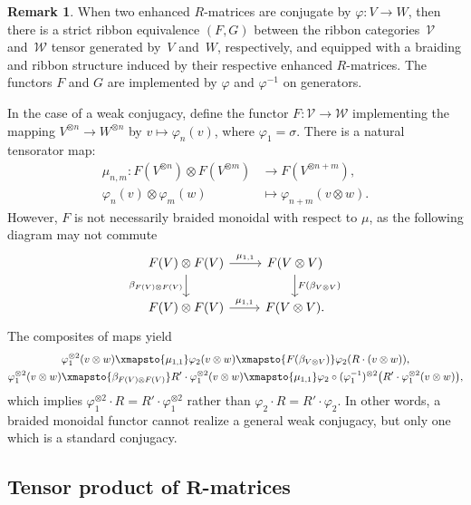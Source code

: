 \documentclass[10pt,a4paper]{amsart}
\numberwithin{equation}{section}
\theoremstyle{definition}
\newtheorem{Remark}[Theorem]{Remark}
\begin{document}
\begin{Remark}
 When two enhanced $R$-matrices are conjugate by $\varphi\colon V\to W$, then there is a strict ribbon equivalence $(F,G)$ between the ribbon categories~$\mathcal{V}$ and~$\mathcal{W}$ tensor generated by~$V$ and~$W$, respectively, and equipped with a braiding and ribbon structure induced by their respective enhanced $R$-matrices. The functors $F$ and $G$ are implemented by $\varphi$ and $\varphi^{-1}$ on generators.

In the case of a weak conjugacy, define the functor $F:\mathcal{V}\to\mathcal{W}$ implementing the mapping $V^{\otimes n} \to W^{\otimes n}$ by $v\mapsto \varphi_n(v)$, where $\varphi_1=\sigma$. There is a natural tensorator map:
\begin{align*} \mu_{n,m}\colon F(V^{\otimes n})\otimes F(V^{\otimes m})&\to F(V^{\otimes n+m}),
 \\
 \varphi_n(v)\otimes \varphi_m(w)&\mapsto\varphi_{n+m}(v\otimes w) .
 \end{align*}
However, $F$ is not necessarily braided monoidal with respect to $\mu$, as the following diagram may not commute
\begin{equation*}
\begin{tikzcd}
 F(V)\otimes F(V) \ar[r,"\mu_{1,1}"] \ar[d,swap,"\beta_{F(V)\otimes F(V)}"] & F(V\otimes V)
 \ar[d,"F(\beta_{V\otimes V})"]
 \\
 F(V)\otimes F(V)\ar[r,"\mu_{1,1}"]& F(V\otimes V).
 \end{tikzcd}
\end{equation*}
The composites of maps yield
\begin{gather*}
\varphi_1^{\otimes 2}(v\otimes w)
 \xmapsto{\mu_{1,1}}
 \varphi_2(v\otimes w)
 \xmapsto{F(\beta_{V\otimes V})}
 \varphi_2(R\cdot (v\otimes w)),
 \\
\varphi_1^{\otimes 2}(v\otimes w)
 \xmapsto{\beta_{F(V)\otimes F(V)}}
 R'\cdot \varphi_1^{\otimes 2}(v\otimes w)
 \xmapsto{\mu_{1,1}}
 \varphi_2\circ (\varphi_1^{-1})^{\otimes 2}\bigl(R'\cdot \varphi_1^{\otimes 2}(v\otimes w)\bigr),
\end{gather*}
which implies $\varphi_1^{\otimes 2}\cdot R = R'\cdot \varphi_1^{\otimes 2}$ rather than $\varphi_2\cdot R = R'\cdot \varphi_2$. In other words, a braided monoidal functor cannot realize a general weak conjugacy, but only one which is a standard conjugacy.
\end{Remark}

\subsection[Tensor product of R-matrices]{Tensor product of $\boldsymbol{R}$-matrices}
\label{sub.tensor}
\end{document}
